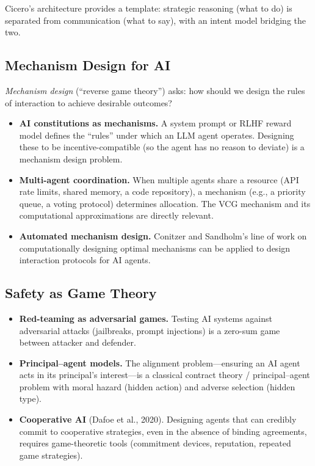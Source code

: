 \documentclass[11pt,a4paper]{article}
\theoremstyle{plain}
\theoremstyle{definition}
\begin{document}
Cicero's architecture provides a template: strategic reasoning (what to
do) is separated from communication (what to say), with an intent model
bridging the two.

\subsection{Mechanism Design for AI}

\emph{Mechanism design} (``reverse game theory'') asks: how should we
design the rules of interaction to achieve desirable outcomes?

\begin{itemize}
  \item \textbf{AI constitutions as mechanisms.}  A system prompt or
    RLHF reward model defines the ``rules'' under which an LLM agent
    operates.  Designing these to be incentive-compatible (so the agent
    has no reason to deviate) is a mechanism design problem.
  \item \textbf{Multi-agent coordination.}  When multiple agents share a
    resource (API rate limits, shared memory, a code repository), a
    mechanism (e.g., a priority queue, a voting protocol) determines
    allocation.  The VCG mechanism and its computational approximations
    are directly relevant.
  \item \textbf{Automated mechanism design.}  Conitzer and Sandholm's
    line of work on computationally designing optimal mechanisms can be
    applied to design interaction protocols for AI agents.
\end{itemize}

\subsection{Safety as Game Theory}

\begin{itemize}
  \item \textbf{Red-teaming as adversarial games.}  Testing AI systems
    against adversarial attacks (jailbreaks, prompt injections) is a
    zero-sum game between attacker and defender.
  \item \textbf{Principal--agent models.}  The alignment problem---ensuring
    an AI agent acts in its principal's interest---is a classical
    contract theory / principal--agent problem with moral hazard (hidden
    action) and adverse selection (hidden type).
  \item \textbf{Cooperative AI} (Dafoe et al., 2020).  Designing agents
    that can credibly commit to cooperative strategies, even in the
    absence of binding agreements, requires game-theoretic tools
    (commitment devices, reputation, repeated game strategies).
\end{itemize}
\end{document}
